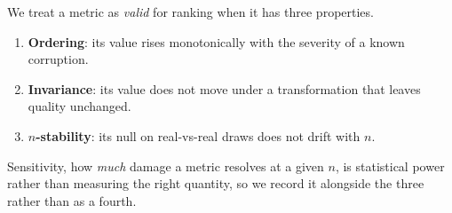 We treat a metric as \emph{valid} for ranking when it has three properties.
\begin{enumerate}
    \item 
\textbf{Ordering}: its value rises monotonically with the severity of a known corruption.
    \item \textbf{Invariance}: its value does not move under a transformation
that leaves quality unchanged. 
\item \textbf{$n$-stability}: its null on real-vs-real draws
does not drift with $n$. 
\end{enumerate}
Sensitivity, how \emph{much} damage a metric
resolves at a given $n$, is statistical power rather than measuring the right quantity, so
we record it alongside the three rather than as a fourth.
